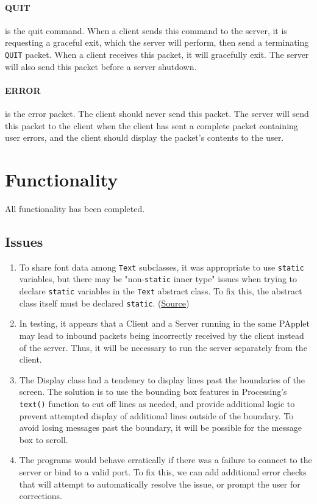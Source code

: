 \documentclass{article}
\begin{document}
\paragraph{QUIT} is the quit command. When a client sends this command to the server, it is requesting a graceful exit, which the server will perform, then send a terminating \verb|QUIT| packet. When a client receives this packet, it will gracefully exit. The server will also send this packet before a server shutdown.

\paragraph{ERROR} is the error packet. The client should never send this packet. The server will send this packet to the client when the client has sent a complete packet containing user errors, and the client should display the packet's contents to the user.

\section{Functionality}
All functionality has been completed.

\subsection{Issues}
\begin{enumerate}
    \item To share font data among \verb|Text| subclasses, it was appropriate to use \verb|static| variables, but there may be "non-\verb|static| inner type" issues when trying to declare \verb|static| variables in the \verb|Text| abstract class. To fix this, the abstract class itself must be declared \verb|static|. (\href{https://forum.processing.org/two/discussion/23623/when-creating-a-class-what-is-it-an-inner-class-of-declared-static-in-a-non-static-inner-type.html}{Source})
    \item In testing, it appears that a Client and a Server running in the same PApplet may lead to inbound packets being incorrectly received by the client instead of the server. Thus, it will be necessary to run the server separately from the client.
    \item The Display class had a tendency to display lines past the boundaries of the screen. The solution is to use the bounding box features in Processing's \verb|text()| function to cut off lines as needed, and provide additional logic to prevent attempted display of additional lines outside of the boundary. To avoid losing messages past the boundary, it will be possible for the message box to scroll.
    \item The programs would behave erratically if there was a failure to connect to the server or bind to a valid port. To fix this, we can add additional error checks that will attempt to automatically resolve the issue, or prompt the user for corrections.
\end{enumerate}
\end{document}
